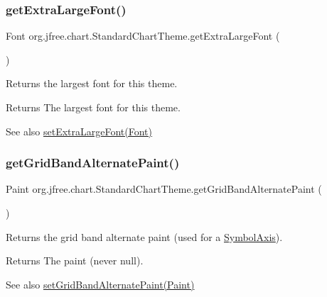 \subsubsection{\texorpdfstring{get\+Extra\+Large\+Font()}{getExtraLargeFont()}}
{\footnotesize\ttfamily Font org.\+jfree.\+chart.\+Standard\+Chart\+Theme.\+get\+Extra\+Large\+Font (\begin{DoxyParamCaption}{ }\end{DoxyParamCaption})}

Returns the largest font for this theme.

\begin{DoxyReturn}{Returns}
The largest font for this theme.
\end{DoxyReturn}
\begin{DoxySeeAlso}{See also}
\mbox{\hyperlink{classorg_1_1jfree_1_1chart_1_1_standard_chart_theme_adccbed6b93551e77c4432d4952ffac12}{set\+Extra\+Large\+Font(\+Font)}} 
\end{DoxySeeAlso}
\mbox{\label{classorg_1_1jfree_1_1chart_1_1_standard_chart_theme_a71a0211f432b4f5c545cdb4850492730}} 
\subsubsection{\texorpdfstring{get\+Grid\+Band\+Alternate\+Paint()}{getGridBandAlternatePaint()}}
{\footnotesize\ttfamily Paint org.\+jfree.\+chart.\+Standard\+Chart\+Theme.\+get\+Grid\+Band\+Alternate\+Paint (\begin{DoxyParamCaption}{ }\end{DoxyParamCaption})}

Returns the grid band alternate paint (used for a \mbox{\hyperlink{}{Symbol\+Axis}}).

\begin{DoxyReturn}{Returns}
The paint (never {\ttfamily null}).
\end{DoxyReturn}
\begin{DoxySeeAlso}{See also}
\mbox{\hyperlink{classorg_1_1jfree_1_1chart_1_1_standard_chart_theme_aec5241d250f54281250b41e088b8fbd6}{set\+Grid\+Band\+Alternate\+Paint(\+Paint)}} 
\end{DoxySeeAlso}
\mbox{\label{classorg_1_1jfree_1_1chart_1_1_standard_chart_theme_aa3daf85d499182e7c15b01e65e7ef569}} 
